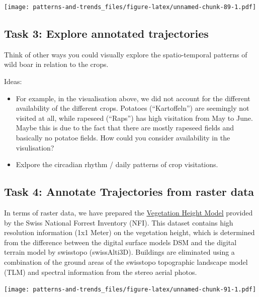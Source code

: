 \documentclass[
]{book}
\providecommand{\tightlist}{%
  \setlength{\itemsep}{0pt}\setlength{\parskip}{0pt}}
\begin{document}
\texttt{[image: patterns-and-trends\_files/figure-latex/unnamed-chunk-89-1.pdf]}

\hypertarget{task-3-explore-annotated-trajectories}{%
\subsection{Task 3: Explore annotated trajectories}\label{task-3-explore-annotated-trajectories}}

Think of other ways you could visually explore the spatio-temporal patterns of wild boar in relation to the crops.

Ideas:

\begin{itemize}
\tightlist
\item
  For example, in the visualisation above, we did not account for the different availability of the different crops. Potatoes (``Kartoffeln'') are seemingly not visited at all, while rapeseed (``Raps'') has high visitation from May to June. Maybe this is due to the fact that there are mostly rapeseed fields and basically no potatoe fields. How could you consider availability in the visulisation?
\item
  Exlpore the circadian rhythm / daily patterns of crop visitations.
\end{itemize}

\hypertarget{task-4-annotate-trajectories-from-raster-data}{%
\subsection{Task 4: Annotate Trajectories from raster data}\label{task-4-annotate-trajectories-from-raster-data}}

In terms of raster data, we have prepared the \href{https://map.geo.admin.ch/index.html?zoom=5\&lang=en\&topic=ech\&bgLayer=ch.swisstopo.pixelkarte-grau\&layers_opacity=0.5\&layers=ch.bafu.landesforstinventar-vegetationshoehenmodell\&E=2627157.14\&N=1122170.97}{Vegetation Height Model} provided by the Swiss National Forrest Inventory (NFI). This dataset contains high resolution information (1x1 Meter) on the vegetation height, which is determined from the difference between the digital surface models DSM and the digital terrain model by swisstopo (swissAlti3D). Buildings are eliminated using a combination of the ground areas of the swisstopo topographic landscape model (TLM) and spectral information from the stereo aerial photos.

\texttt{[image: patterns-and-trends\_files/figure-latex/unnamed-chunk-91-1.pdf]}
\end{document}
